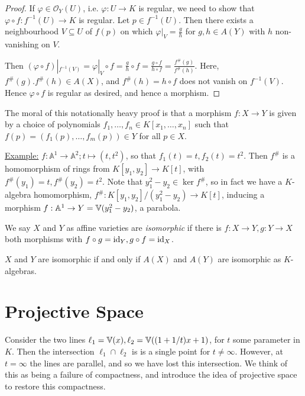 \documentclass[10pt,a4paper,rgb]{article}
\begin{document}
\begin{proof}
If $\varphi \in \mathcal{O}_Y(U)$, i.e. $\varphi:U \to K$ is regular, we need to show that $\varphi \circ f: f^{-1}(U) \to K$ is regular. Let $p \in f^{-1}(U)$. Then there exists a neighbourhood $V \subseteq U$ of $f(p)$ on which $\varphi|_V = \frac{g}{h}$ for $g, h \in A(Y)$ with $h$ non-vanishing on $V$.

Then $(\varphi \circ f)|_{f^{-1}(V)} = \varphi|_V \circ f = \frac{g}{h}\circ f = \frac{g\circ f}{h\circ f} = \frac{f^{\#}(g)}{f^{\#}(h)}$. Here, $f^{\#}(g). f^{\#}(h) \in A(X)$, and $f^{\#}(h) = h \circ f$ does not vanish on $f^{-1}(V)$. Hence $\varphi\circ f$ is regular as desired, and hence a morphism.
\end{proof}

The moral of this notationally heavy proof is that a morphism $f: X\to Y$ is given by a choice of polynomials $f_1, \ldots, f_n \in K[x_1, \ldots, x_n]$ such that $f(p) = (f_1(p), \ldots, f_m(p)) \in Y$ for all $p \in X$.

\hspace*{-1em}\underline{Example:} $f: \mathbb{A}^1 \to \mathbb{A}^2; t \mapsto (t, t^2)$, so that $f_1(t) = t, f_2(t) = t^2$. Then $f^{\#}$ is a homomorphism of rings from $K[y_1, y_2] \to K[t]$, with $f^{\#}(y_1) = t, f^{\#}(y_2) = t^2$. Note that $y_1^2-y_2 \in \ker f^{\#}$, so in fact we have a $K$-algebra homomorphism, $f^{\#}:K[y_1, y_2]/(y_1^2-y_2) \to K[t]$, inducing a morphism $f:\mathbb{A}^1 \to Y = \mathbb{V}(y_1^2-y_2)$, a parabola.

We say $X$ and $Y$ as affine varieties are \emph{isomorphic} if there is $f:X \to Y, g:Y \to X$ both morphisms with $f\circ g = \operatorname{id}_Y, g \circ f = \operatorname{id}_X$.

\begin{corollary}
$X$ and $Y$ are isomorphic if and only if $A(X)$ and $A(Y)$ are isomorphic as $K$-algebras.
\end{corollary}

\section{Projective Space}
Consider the two lines $\ell_1 = \mathbb{V}(x), \ell_2 = \mathbb{V}((1+1/t)x + 1)$, for $t$ some parameter in $K$. Then the intersection $\ell_1 \cap \ell_2$ is is a single point for $t \neq \infty$. However, at $t = \infty$ the lines are parallel, and so we have lost this intersection. We think of this as being a failure of compactness, and introduce the idea of projective space to restore this compactness.
\end{document}

